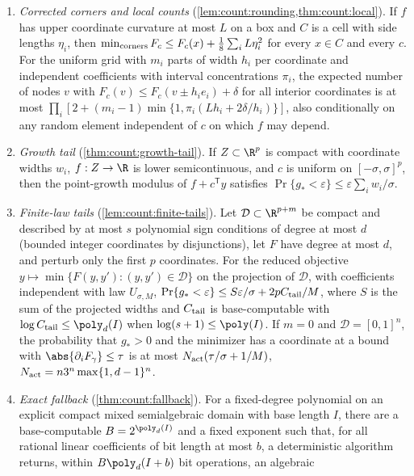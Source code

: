 \begin{enumerate}[label=(T\arabic*),leftmargin=*]
\item\label{it:app:rec:local} \emph{Corrected corners and local counts}
(\cref{lem:count:rounding,thm:count:local}). If $f$ has upper coordinate
curvature at most $L$ on a box and $C$ is a cell with side lengths
$\eta_i$, then $\min_{\rm corners}F_c\le F_c(x)+\frac18\sum_iL\eta_i^2$ for
every $x\in C$ and every $c$. For the uniform grid with $m_i$ parts of width
$h_i$ per coordinate and independent coefficients with interval
concentrations $\pi_i$, the expected number of nodes $v$ with
$F_c(v)\le F_c(v\pm h_ie_i)+\delta$ for all interior coordinates is at most
$\prod_i[2+(m_i-1)\min\{1,\pi_i(Lh_i+2\delta/h_i)\}]$, also conditionally on
any random element independent of $c$ on which $f$ may depend.
\item\label{it:app:rec:growth} \emph{Growth tail}
(\cref{thm:count:growth-tail}). If $Z\subset\R^p$ is compact with coordinate
widths $w_i$, $f:Z\to\R$ is lower semicontinuous, and $c$ is uniform on
$[-\sigma,\sigma]^p$, then the point-growth modulus of $f+c^{\mathsf T}y$
satisfies $\Pr\{g_*<\varepsilon\}\le\varepsilon\sum_iw_i/\sigma$.
\item\label{it:app:rec:finite} \emph{Finite-law tails}
(\cref{lem:count:finite-tails}). Let $\mathcal D\subset\R^{p+m}$ be compact
and described by at most $s$ polynomial sign conditions of degree at most
$d$ (bounded integer coordinates by disjunctions), let $F$ have degree at
most $d$, and perturb only the first $p$ coordinates. For the reduced
objective $y\mapsto\min\{F(y,y'):(y,y')\in\mathcal D\}$ on the projection of
$\mathcal D$, with coefficients independent with law $U_{\sigma,M}$,
$\Pr\{g_*<\varepsilon\}\le S\varepsilon/\sigma+2pC_{\rm tail}/M$, where $S$ is
the sum of the projected widths and $C_{\rm tail}$ is base-computable with
$\log C_{\rm tail}\le\poly_d(I)$ when $\log(s+1)\le\poly(I)$. If $m=0$ and
$\mathcal D=[0,1]^n$, the probability that $g_*>0$ and the minimizer has a
coordinate at a bound with $\abs{\partial_iF_\gamma}\le\tau$ is at most
$N_{\rm act}(\tau/\sigma+1/M)$, $N_{\rm act}=n3^n\max\{1,d-1\}^n$.
\item\label{it:app:rec:fallback} \emph{Exact fallback}
(\cref{thm:count:fallback}). For a fixed-degree polynomial on an explicit
compact mixed semialgebraic domain with base length $I$, there are a
base-computable $B=2^{\poly_d(I)}$ and a fixed exponent such that, for all
rational linear coefficients of bit length at most $b$, a deterministic
algorithm returns, within $B\poly_d(I+b)$ bit operations, an algebraic

\end{enumerate}
